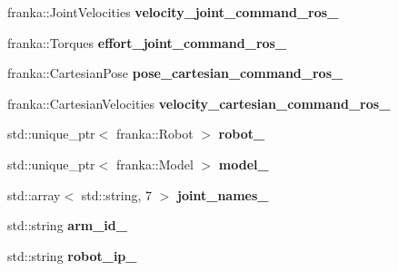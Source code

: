 \begin{DoxyCompactItemize}
\mbox{\label{classfranka__hw_1_1_franka_h_w_a2ce1c75e2e75aa476df6e239b9092b11}} 
franka\+::\+Joint\+Velocities {\bfseries velocity\+\_\+joint\+\_\+command\+\_\+ros\+\_\+}
\item 
\mbox{\label{classfranka__hw_1_1_franka_h_w_abcd805f67e92fb88bd8b218f65a7c911}} 
franka\+::\+Torques {\bfseries effort\+\_\+joint\+\_\+command\+\_\+ros\+\_\+}
\item 
\mbox{\label{classfranka__hw_1_1_franka_h_w_a9d5962dbb07400fffe3a93aa51a6ba74}} 
franka\+::\+Cartesian\+Pose {\bfseries pose\+\_\+cartesian\+\_\+command\+\_\+ros\+\_\+}
\item 
\mbox{\label{classfranka__hw_1_1_franka_h_w_ac84657c0511e75821c08a6ea51b51a86}} 
franka\+::\+Cartesian\+Velocities {\bfseries velocity\+\_\+cartesian\+\_\+command\+\_\+ros\+\_\+}
\item 
\mbox{\label{classfranka__hw_1_1_franka_h_w_ad92d666e7ded9c9c24db7418d0fedb88}} 
std\+::unique\+\_\+ptr$<$ franka\+::\+Robot $>$ {\bfseries robot\+\_\+}
\item 
\mbox{\label{classfranka__hw_1_1_franka_h_w_a3f4f13a4df9617f50df10ae4e4d6c536}} 
std\+::unique\+\_\+ptr$<$ franka\+::\+Model $>$ {\bfseries model\+\_\+}
\item 
\mbox{\label{classfranka__hw_1_1_franka_h_w_a209e8f3424efe0fd05725be609d7205a}} 
std\+::array$<$ std\+::string, 7 $>$ {\bfseries joint\+\_\+names\+\_\+}
\item 
\mbox{\label{classfranka__hw_1_1_franka_h_w_a97b5be24f33b2253a637d74ebdd66fa0}} 
std\+::string {\bfseries arm\+\_\+id\+\_\+}
\item 
\mbox{\label{classfranka__hw_1_1_franka_h_w_a88a3373d4deb835fd0a825c14c31b073}} 
std\+::string {\bfseries robot\+\_\+ip\+\_\+}
\item 
\mbox{\label{classfranka__hw_1_1_franka_h_w_ae6965976c623e2ea3c460611d113858b}} 

\end{DoxyCompactItemize}
